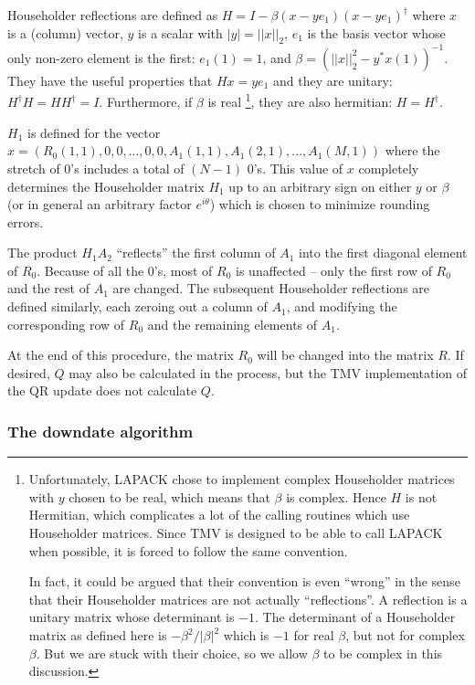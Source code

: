 \documentclass[twoside,letterpaper,11pt]{article}
\begin{document}
Householder reflections are defined as $H = I - \beta (x - y e_1)  (x - y e_1)^\dagger$
where $x$ is a (column) vector, $y$ is a scalar with $|y| = ||x||_2$, $e_1$ is the
basis vector whose only non-zero element is the first: $e_1(1) = 1$, and
$\beta = (||x||_2^2 - y^* x(1))^{-1}$.
They have the useful properties that $H x = y e_1$ and they are unitary:
$H^\dagger H = H H^\dagger = I$.
Furthermore, if $\beta$ is real
\footnote{
Unfortunately, LAPACK chose to implement complex Householder matrices 
with $y$ chosen to be real, which means that $\beta$ is complex.  Hence
$H$ is not Hermitian, which complicates a lot of the calling routines which use
Householder matrices.  Since TMV is designed to be able to call LAPACK
when possible, it is forced to follow the same convention.

In fact, it could be argued that their convention is even ``wrong'' in the sense that
their Householder matrices are not actually ``reflections''.  A reflection is a 
unitary matrix whose determinant is $-1$.  The determinant of a Householder 
matrix as defined here is $-\beta^2/|\beta|^2$ which is $-1$ for real $\beta$, 
but not for complex $\beta$.  But we are stuck with their choice, so we allow $\beta$
to be complex in this discussion.
}, they are also hermitian: $H = H^\dagger$.

$H_1$ is defined for the vector 
$x = (R_0(1,1), 0, 0, ... , 0, 0, A_1(1,1), A_1(2,1), ... , A_1(M,1) )$ 
where the stretch of $0$'s includes a total of $(N-1)$ $0$'s. This value of 
$x$ completely determines the Householder matrix $H_1$ up to an arbitrary sign
on either $y$ or $\beta$ (or in general an arbitrary factor $e^{i \theta}$) which is 
chosen to minimize rounding errors.

The product $H_1 A_2$ ``reflects'' the first column
of $A_1$ into the first diagonal element of $R_0$.  Because of all the $0$'s, 
most of $R_0$ is unaffected -- only the first row of $R_0$ and the rest of $A_1$
are changed.
The subsequent Householder reflections are defined similarly, each zeroing out
a column of $A_1$, and modifying the corresponding row of $R_0$ and the 
remaining elements of $A_1$.

At the end of this procedure, the matrix $R_0$ will be changed into the 
matrix $R$.  If desired, $Q$ may also be calculated in the process, but the 
TMV implementation of the QR update does not calculate $Q$.

\subsubsection{The downdate algorithm}
\end{document}
